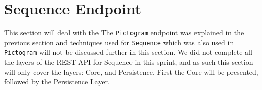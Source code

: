 \section{Sequence Endpoint}
This section will deal with the  
The \texttt{Pictogram} endpoint was explained in the previous section and techniques used for \texttt{Sequence} which was also used in \texttt{Pictogram} will not be discussed further in this section.
We did not complete all the layers of the REST API for Sequence in this sprint, and as such this section will only cover the layers: Core, and Persistence.
First the Core will be presented, followed by the Persistence Layer.